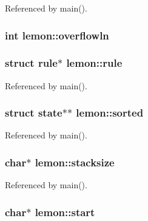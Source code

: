 Referenced by main().

\hypertarget{structlemon_acc8a35189944152a02bbf4fc07911089}{
\subsubsection[{overflowln}]{\setlength{\rightskip}{0pt plus 5cm}int lemon\-::overflowln}}\label{structlemon_acc8a35189944152a02bbf4fc07911089}
\hypertarget{structlemon_a2fa36e0fa6e3789057bbfaf2dd693a8e}{
\subsubsection[{rule}]{\setlength{\rightskip}{0pt plus 5cm}struct {\bf rule}$\ast$ lemon\-::rule}}\label{structlemon_a2fa36e0fa6e3789057bbfaf2dd693a8e}


Referenced by main().

\hypertarget{structlemon_ac2948d15b5871689b5e81a53b2d9a784}{
\subsubsection[{sorted}]{\setlength{\rightskip}{0pt plus 5cm}struct {\bf state}$\ast$$\ast$ lemon\-::sorted}}\label{structlemon_ac2948d15b5871689b5e81a53b2d9a784}


Referenced by main().

\hypertarget{structlemon_aae5b11fade9ca3ca21fa6d3c1ed7545a}{
\subsubsection[{stacksize}]{\setlength{\rightskip}{0pt plus 5cm}char$\ast$ lemon\-::stacksize}}\label{structlemon_aae5b11fade9ca3ca21fa6d3c1ed7545a}


Referenced by main().

\hypertarget{structlemon_ac94fcf0e746da894b198df228cf6d6e2}{
\subsubsection[{start}]{\setlength{\rightskip}{0pt plus 5cm}char$\ast$ lemon\-::start}}\label{structlemon_ac94fcf0e746da894b198df228cf6d6e2}


